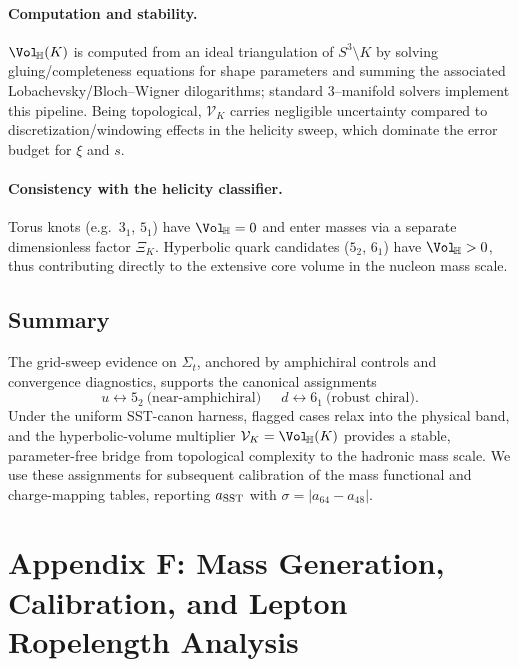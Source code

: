 \documentclass[11pt, preprint,titlepage]{revtex4-2}
\begin{document}
		\paragraph{Computation and stability.}
		\(\Vol_{\!\mathbb{H}}(K)\) is computed from an ideal triangulation of \(S^3\!\setminus\!K\) by solving gluing/completeness equations for shape parameters and summing the associated Lobachevsky/Bloch–Wigner dilogarithms; standard 3–manifold solvers implement this pipeline. Being topological, \(\mathcal V_K\) carries negligible uncertainty compared to discretization/windowing effects in the helicity sweep, which dominate the error budget for \(\xi\) and \(s\).

		\paragraph{Consistency with the helicity classifier.}
		Torus knots (e.g.\ \(3_1\), \(5_1\)) have \(\Vol_{\!\mathbb{H}}=0\) and enter masses via a separate dimensionless factor \(\Xi_K\). Hyperbolic quark candidates (\(5_2\), \(6_1\)) have \(\Vol_{\!\mathbb{H}}>0\), thus contributing directly to the extensive core volume in the nucleon mass scale.

		\subsection*{Summary}
		The grid-sweep evidence on \(\Sigma_t\), anchored by amphichiral controls and convergence diagnostics, supports the canonical assignments
		\[
		\boxed{u\!\leftrightarrow\!5_2\ \text{(near-amphichiral)}\quad\ \ d\!\leftrightarrow\!6_1\ \text{(robust chiral)}}.
		\]
		Under the uniform SST-canon harness, flagged cases relax into the physical band, and the hyperbolic-volume multiplier \(\mathcal V_K=\Vol_{\!\mathbb{H}}(K)\) provides a stable, parameter-free bridge from topological complexity to the hadronic mass scale. We use these assignments for subsequent calibration of the mass functional and charge-mapping tables, reporting \(a_{\rm SST}\) with \(\sigma=|a_{64}-a_{48}|\).

	\section*{Appendix F: Mass Generation, Calibration, and Lepton Ropelength Analysis}
	\label{sec:calibration_hierarchy}
\end{document}
